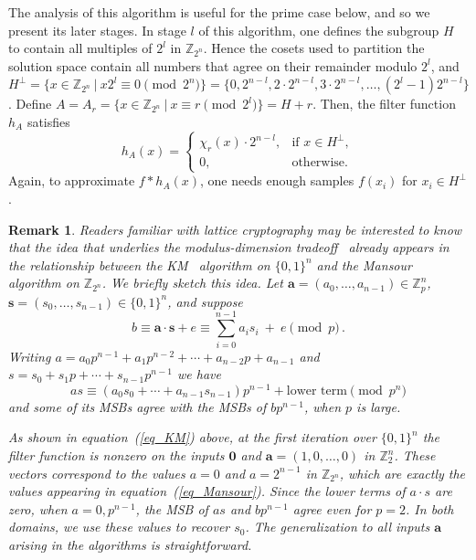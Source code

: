 \documentclass[11pt]{article}
\newtheorem{remark}[theorem]{Remark}
\theoremstyle{definition}
\newcommand{\Z}{\mathbb{Z}}
\begin{document}
The analysis of this algorithm is useful for the prime case below, and so we present its later stages. In stage $l$ of this algorithm, one defines the subgroup $H$ to contain all multiples of $2^l$ in $\Z_{2^n}$. Hence the cosets used to partition the solution space contain all numbers that agree on their remainder modulo $2^l$, and $H^\perp = \{x \in \Z_{2^n} \ | \ x 2^l \equiv 0 \pmod{ 2^n } \} =  \{0, 2^{n-l}, 2 \cdot 2^{n-l}, 3 \cdot 2^{n-l}, \dots, (2^l-1) 2^{n-l} \}$. Define $A = A_r = \{x \in \Z_{2^n} \ | \ x \equiv r \pmod{2^l} \} = H + r$. Then, the filter function $h_A$ satisfies
\begin{equation}\label{Zp_filter}
    h_A(x) = \begin{cases} \chi_{r}(x) \cdot 2^{n-l}, & \text{if }x\in H^\perp, \\ 0, &\text{otherwise.}\end{cases}
\end{equation}
Again, to approximate $f \ast h_A(x)$, one needs enough samples $f(x_i)$ for $x_i \in H^\perp$.


\begin{remark}\label{rem_mod-dim}
    Readers familiar with lattice cryptography may be interested to know that %
    the idea that underlies the modulus-dimension tradeoff~\cite{mod-dim} already appears in the relationship between the KM~\cite{KM} algorithm on $\{0,1\}^n$ and the Mansour~\cite{Mansour92} algorithm on $\Z_{2^n}$.
    We briefly sketch this idea. Let $\textbf{a} = (a_0,\ldots,a_{n-1}) \in \Z^n_p$, $\textbf{s} = (s_0,\ldots,s_{n-1}) \in \{0,1\}^n$, and suppose
    \[
        b \equiv \textbf{a} \cdot \textbf{s} + e \equiv \sum_{i=0}^{n-1} a_i s_i \ + \ e \pmod{p} \,.
    \]
    Writing $a = a_0 p^{n-1} + a_1 p^{n-2} + \cdots + a_{n-2} p + a_{n-1}$ and $s = s_0 + s_1 p + \cdots + s_{n-1} p^{n-1}$ we have
    \[
        as \equiv (a_0 s_0 + \cdots + a_{n-1} s_{n-1})p^{n-1} + \text{lower term} \pmod{p^n}
    \]
    and some of its MSBs agree with the MSBs of $b p^{n-1}$, when $p$ is large.

    As shown in equation~(\ref{eq_KM}) above, at the first iteration over $\{0,1\}^n$ the filter function is nonzero on the inputs $\textbf{0}$ and $\textbf{a} = (1,0,\ldots,0)$ in $\Z^n_2$.
    These vectors correspond to the values $a = 0$ and $a = 2^{n-1}$ in $\Z_{2^n}$, which are exactly the values appearing in equation~(\ref{eq_Mansour}). Since the lower terms of $a \cdot s$ are zero, when $a=0,p^{n-1}$, the MSB of $as$ and $b p^{n-1}$ agree even for $p=2$. In both domains, we use these values to recover $s_0$.
    The generalization to all inputs $\textbf{a}$ arising in the algorithms is straightforward.
\end{remark}
\end{document}
